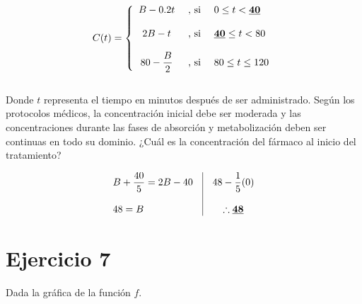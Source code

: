 \documentclass[12pt]{article}
\begin{document}
\[
C(t) = 
\left\{
  \begin{array}{c l l}
    B - 0.2t & \text{ , si } & 0 \leq t < \textbf{\underline{40}} \\\\
    2B - t & \text{ , si } & \textbf{\underline{40}} \leq t < 80 \\\\
    80 - \dfrac{B}{2} & \text{ , si } & 80 \leq t \leq 120
  \end{array}
\right.
\] \\

\noindent Donde $t$ representa el tiempo en minutos después de ser administrado. Según los protocolos médicos,
la concentración inicial debe ser moderada y las concentraciones durante las fases de absorción y metabolización
deben ser continuas en todo su dominio. ¿Cuál es la concentración del fármaco al inicio del tratamiento?

\[
\begin{array}{l|c}
  \begin{array}{l}
    B + \dfrac{40}{5} = 2B - 40 \\\\
    48 = B  
  \end{array}
  &
  \begin{array}{c}
    48 - \dfrac{1}{5}(0) \\\\
    \therefore \textbf{\underline{48}}
  \end{array}
\end{array}
\]



\newpage
\section*{Ejercicio 7}
\noindent Dada la gráfica de la función $f$.
\end{document}
